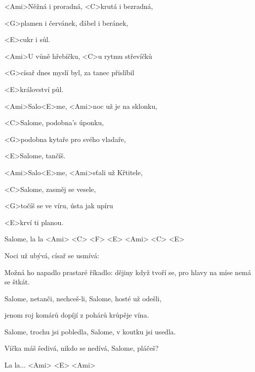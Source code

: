 

\zs
<Ami>Něžná i proradná, <C>krutá i bezradná,

<G>plamen i červánek, ďábel i beránek,

<E>cukr i sůl.

<Ami>U vůně hřebíčku, <C>u rytmu střevíčků

<G>císař dnes myslí byl, za tanec přislíbil

<E>království půl.
\ks

\zr
<Ami>Salo<E>me, <Ami>noc už je na sklonku,

<C>Salome, podobna's úponku,

<G>podobna kytaře pro svého vladaře,

<E>Salome, tančíš.

<Ami>Salo<E>me, <Ami>sťali už Křtitele,

<C>Salome, zasměj se vesele,

<G>točíš se ve víru, ústa jak upíru

<E>krví ti planou.

Salome, la la <Ami> <C> <F> <E> <Ami> <C> <E>
\kr

\zs
Noci už ubývá, císař se usmívá: 

Možná ho napadlo prastaré říkadlo: dějiny když tvoří se, pro hlavy na míse nemá se štkát.
\ks

\zr
Salome, netanči, nechceš-li, Salome, hosté už odešli,

jenom roj komárů dopíjí z pohárů krůpěje vína.

Salome, trochu jsi pobledla, Salome, v koutku jsi usedla.

Víčka máš šedivá, nikdo se nedívá, Salome, pláčeš?

La la... <Ami> <E> <Ami>
\kr

\kp

